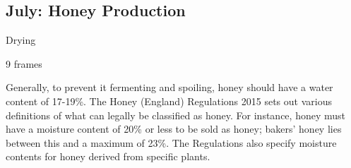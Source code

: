 \subsection{July: Honey Production}

Drying

9 frames

Generally, to prevent it fermenting and spoiling, honey should have a water content of 17-19\%.
The Honey (England) Regulations 2015 sets out various definitions of what can legally be classified as honey.
For instance, honey must have a moisture content of 20\% or less to be sold as honey;
bakers' honey lies between this and a maximum of 23\%.
The Regulations also specify moisture contents for honey derived from specific plants.
